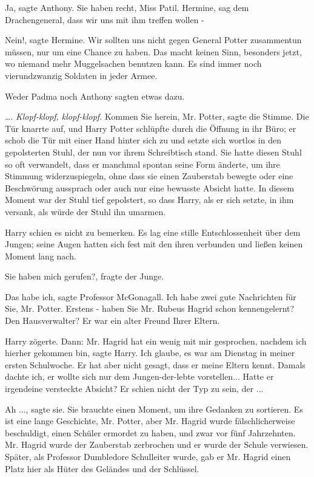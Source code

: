 \glqq{}Ja\grqq{}, sagte Anthony. \glqq{}Sie haben recht, Miss Patil. Hermine, sag
dem Drachengeneral, dass wir uns mit ihm treffen wollen -\grqq{}

\glqq{}Nein!\grqq{}, sagte Hermine. \glqq{}Wir sollten uns nicht gegen General
Potter zusammentun müssen, nur um eine Chance zu haben. Das macht keinen Sinn,
besonders jetzt, wo niemand mehr Muggelsachen benutzen kann. Es sind immer noch
vierundzwanzig Soldaten in jeder Armee.\grqq{}

Weder Padma noch Anthony sagten etwas dazu.

….
\emph{Klopf-klopf, klopf-klopf.}
\glqq{}Kommen Sie herein, Mr. Potter\grqq{}, sagte die Stimme. Die Tür knarrte
auf, und Harry Potter schlüpfte durch die Öffnung in ihr Büro; er schob die Tür
mit einer Hand hinter sich zu und setzte sich wortlos in den gepolsterten Stuhl,
der nun vor ihrem Schreibtisch stand. Sie hatte diesen Stuhl so oft verwandelt,
dass er manchmal spontan seine Form änderte, um ihre Stimmung widerzuspiegeln,
ohne dass sie einen Zauberstab bewegte oder eine Beschwörung aussprach oder auch
nur eine bewusste Absicht hatte. In diesem Moment war der Stuhl tief gepolstert,
so dass Harry, als er sich setzte, in ihm versank, als würde der Stuhl ihn
umarmen.

Harry schien es nicht zu bemerken. Es lag eine stille Entschlossenheit über dem
Jungen; seine Augen hatten sich fest mit den ihren verbunden und ließen keinen
Moment lang nach.

\glqq{}Sie haben mich gerufen?\grqq{}, fragte der Junge.

\glqq{}Das habe ich\grqq{}, sagte Professor McGonagall. \glqq{}Ich habe zwei gute
Nachrichten für Sie, Mr. Potter. Erstens - haben Sie Mr. Rubeus Hagrid schon
kennengelernt? Den Hausverwalter? Er war ein alter Freund Ihrer Eltern.\grqq{}

Harry zögerte. Dann: \glqq{}Mr. Hagrid hat ein wenig mit mir gesprochen, nachdem
ich hierher gekommen bin\grqq{}, sagte Harry. \glqq{}Ich glaube, es war am
Dienstag in meiner ersten Schulwoche. Er hat aber nicht gesagt, dass er meine
Eltern kennt. Damals dachte ich, er wollte sich nur dem Jungen-der-lebte
vorstellen... Hatte er irgendeine versteckte Absicht? Er schien nicht der Typ zu
sein, der ...\grqq{}

\glqq{}Ah ...\grqq{}, sagte sie. Sie brauchte einen Moment, um ihre Gedanken zu
sortieren. \glqq{}Es ist eine lange Geschichte, Mr. Potter, aber Mr. Hagrid wurde
fälschlicherweise beschuldigt, einen Schüler ermordet zu haben, und zwar vor
fünf Jahrzehnten. Mr. Hagrid wurde der Zauberstab zerbrochen und er wurde der
Schule verwiesen. Später, als Professor Dumbledore Schulleiter wurde, gab er Mr.
Hagrid einen Platz hier als Hüter des Geländes und der Schlüssel.\grqq{}

